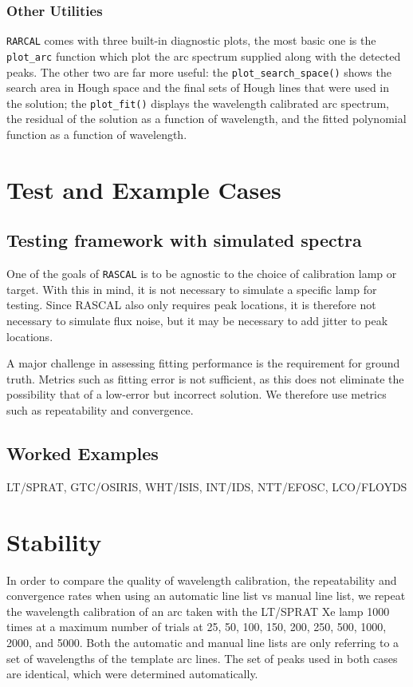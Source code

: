 \documentclass[fleqn,usenatbib]{rasti}
\begin{document}
\subsubsection*{Other Utilities}
\texttt{RARCAL} comes with three built-in diagnostic plots, the most basic
one is the \texttt{plot\_arc} function which plot the arc spectrum
supplied along with the detected peaks. The other two are far more useful:
the \texttt{plot\_search\_space()} shows the search area in Hough space and
the final sets of Hough lines that were used in the solution; the
\texttt{plot\_fit()} displays the wavelength calibrated arc spectrum, the
residual of the solution as a function of wavelength, and the fitted polynomial
function as a function of wavelength.

\section{Test and Example Cases}

\subsection{Testing framework with simulated spectra}

One of the goals of \texttt{RASCAL} is to be agnostic to the choice of calibration
lamp or target. With  this in mind, it is not necessary to simulate a specific
lamp for testing. Since RASCAL also only requires peak locations, it is therefore not necessary to simulate flux noise, but it may be necessary to add jitter to peak locations.

A major challenge in assessing fitting performance is the requirement for ground truth. Metrics such as fitting error is not sufficient, as this does not eliminate the possibility that of a low-error but incorrect solution. We therefore use metrics such as repeatability and convergence.

\subsection{Worked Examples}

LT/SPRAT, GTC/OSIRIS, WHT/ISIS, INT/IDS, NTT/EFOSC, LCO/FLOYDS

\section{Stability}

In order to compare the quality of wavelength calibration, the repeatability and
convergence rates when using an automatic line list vs manual line list, we repeat the
wavelength calibration of an arc taken with the LT/SPRAT Xe lamp 1000 times at a
maximum number of trials at 25, 50, 100, 150, 200, 250, 500, 1000, 2000, and 5000.
Both the automatic and manual line lists are only referring to a set of wavelengths
of the template arc lines. The set of peaks used in both cases are identical, which
were determined automatically.
\end{document}
